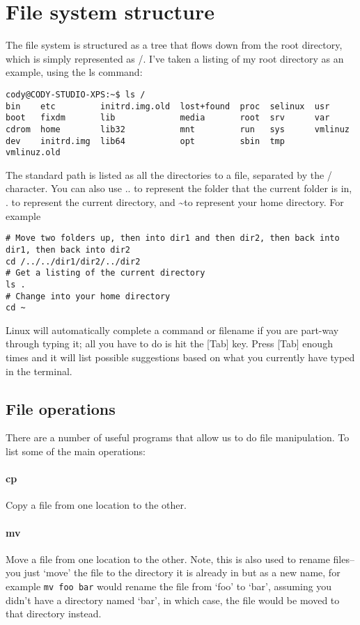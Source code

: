 \documentclass{article}
\begin{document}
\section{File system structure}
The file system is structured as a tree that flows down from the root directory, which is simply represented as /. I've taken a listing of my root directory as an example, using the ls command:
\begin{verbatim}
cody@CODY-STUDIO-XPS:~$ ls /
bin    etc         initrd.img.old  lost+found  proc  selinux  usr
boot   fixdm       lib             media       root  srv      var
cdrom  home        lib32           mnt         run   sys      vmlinuz
dev    initrd.img  lib64           opt         sbin  tmp      vmlinuz.old
\end{verbatim}
The standard path is listed as all the directories to a file, separated by the / character.
You can also use .. to represent the folder that the current folder is in, . to represent the current directory, and \textasciitilde to represent your home directory. For example
\begin{verbatim}
# Move two folders up, then into dir1 and then dir2, then back into dir1, then back into dir2
cd /../../dir1/dir2/../dir2
# Get a listing of the current directory
ls .
# Change into your home directory
cd ~
\end{verbatim}
Linux will automatically complete a command or filename if you are part-way through typing it; all you have to do is hit the [Tab] key. Press [Tab] enough times and it will list possible suggestions based on what you currently have typed in the terminal.

\subsection{File operations}
There are a number of useful programs that allow us to do file manipulation. To list some of the main operations:
\paragraph{cp} 
Copy a file from one location to the other.
\paragraph{mv}
Move a file from one location to the other. Note, this is also used to rename files--you just `move' the file to the directory it is already in but as a new name, for example \texttt{mv foo bar} would rename the file from `foo' to `bar', assuming you didn't have a directory named `bar', in which case, the file would be moved to that directory instead.
\end{document}
